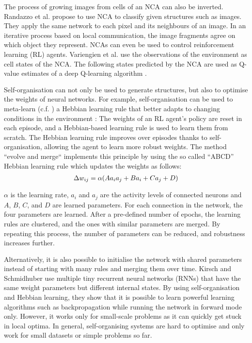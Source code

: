 The process of growing images from cells of an NCA can also be inverted.
Randazzo et al.  propose to use NCA to classify given structures such as images.
They apply the same network to each pixel and its neighbours of an image.
In an iterative process based on local communication, the image fragments agree on which object they represent.
NCAs can even be used to control reinforcement learning (RL) agents.
Variengien et al.  use the observations of the environment as cell states of the NCA. The following states predicted by the NCA are used as Q-value estimates of a deep Q-learning algorithm .

Self-organisation can not only be used to generate structures, but also to optimise the weights of neural networks.
For example, self-organisation can be used to meta-learn (c.f. ) a Hebbian learning rule that better adapts to changing conditions in the environment :
The weights of an RL agent's policy are reset in each episode, and a Hebbian-based learning rule is used to learn them from scratch.
The Hebbian learning rule improves over episodes thanks to self-organisation, allowing the agent to learn more robust weights.
The method ``evolve and merge``  implements this principle by using the so called ``ABCD'' Hebbian learning rule which updates the weights as follows:
\begin{align}\eqlbl{abcd_hebb_rule_risi}
	\Delta w_{ij} = \alpha (A a_i a_j + B a_i + C a_j + D)
\end{align}%

$\alpha$ is the learning rate, $a_i$ and $a_j$ are the activity levels of connected neurons and $A$, $B$, $C$, and $D$ are learned parameters.
For each connection in the network, the four parameters are learned.
After a pre-defined number of epochs, the learning rules are clustered, and the ones with similar parameters are merged.
By repeating this process, the number of parameters can be reduced, and robustness increases further.

Alternatively, it is also possible to initialise the network with shared parameters instead of starting with many rules and merging them over time.
Kirsch and Schmidhuber  use multiple tiny recurrent neural networks (RNNs) that have the same weight parameters but different internal states.
By using self-organisation and Hebbian learning, they show that it is possible to learn powerful learning algorithms such as backpropagation while running the network in forward mode only.
However, it works only for small-scale problems as it can quickly get stuck in local optima.
In general, self-organising systems are hard to optimise and only work for small datasets or simple problems so far.


